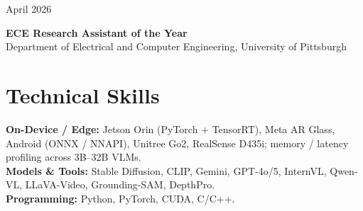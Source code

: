 \documentclass[11pt, letterpaper]{article}
\newenvironment{datedentry}[1]{%
  \par\noindent
  \begin{minipage}[t]{2.8cm}\raggedright\small #1\end{minipage}%
  \hspace{0.3cm}%
  \begin{minipage}[t]{\dimexpr\linewidth-3.1cm\relax}\raggedright
}{\end{minipage}\par\medskip}
\begin{document}
\begin{datedentry}{April 2026}
\textbf{ECE Research Assistant of the Year}\\
Department of Electrical and Computer Engineering, University of Pittsburgh
\end{datedentry}

\section{Technical Skills}
\textbf{On-Device / Edge:} Jetson Orin (PyTorch + TensorRT), Meta AR Glass, Android (ONNX / NNAPI), Unitree Go2, RealSense D435i; memory / latency profiling across 3B--32B VLMs.\\[2pt]
\textbf{Models \& Tools:} Stable Diffusion, CLIP, Gemini, GPT-4o/5, InternVL, Qwen-VL, LLaVA-Video, Grounding-SAM, DepthPro.\\[2pt]
\textbf{Programming:} Python, PyTorch, CUDA, C/C++.
\end{document}
